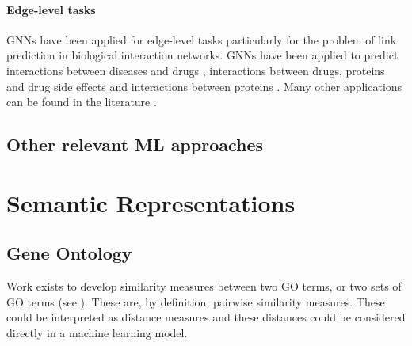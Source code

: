 \documentclass[
	fontsize=10pt, %
	twoside=false, %
	secnumdepth=1, %
  toc=indentunnumbered %
]{kaobook}
\begin{document}






\paragraph{Edge-level tasks} GNNs have been applied for edge-level tasks
particularly for the problem of link prediction in biological interaction
networks. GNNs have been applied to predict interactions between diseases and
drugs \cite{bajaj_GraphConvolutionalNetworks_2017}, interactions between drugs,
proteins and drug side effects \cite{zitnik_modeling_2018} and interactions
between proteins \cite{chereda_ExplainingDecisionsGraph_2021}. Many other
applications can be found in the literature
\cite{zhang_GraphNeuralNetworks_2021}.


\subsection{Other relevant ML approaches}



\section{Semantic Representations}

\subsection{Gene Ontology}

\cite{henry_ConvertingDiseaseMaps_2021}
\cite{ostaszewski_ClusteringApproachesVisual_2018}

Work exists to develop similarity measures
between two GO terms, or two sets of GO terms (see ).
These are, by definition, pairwise similarity measures. These
could be interpreted as distance measures and these distances could be
considered directly in a machine learning model.
\end{document}
